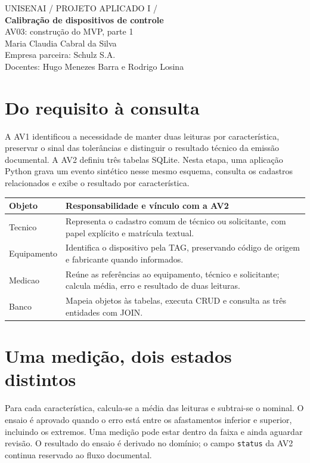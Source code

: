 \documentclass[12pt,a4paper]{article}
\begin{document}
\begin{center}
{\sffamily\small UNISENAI \quad / \quad PROJETO APLICADO I \quad / }\\[1.2cm]
{\sffamily\bfseries\LARGE Calibração de dispositivos de controle}\\[.35cm]
{\large AV03: construção do MVP, parte 1}\\[.8cm]
Maria Claudia Cabral da Silva\\
Empresa parceira: Schulz S.A.\\
Docentes: Hugo Menezes Barra e Rodrigo Losina
\end{center}
\section*{Do requisito à consulta}
A AV1 identificou a necessidade de manter duas leituras por característica, preservar o sinal das tolerâncias e distinguir o resultado técnico da emissão documental. A AV2 definiu três tabelas SQLite. Nesta etapa, uma aplicação Python grava um evento sintético nesse mesmo esquema, consulta os cadastros relacionados e exibe o resultado por característica.

\begin{tabularx}{\linewidth}{@{}lX@{}}
\toprule\textbf{Objeto} & \textbf{Responsabilidade e vínculo com a AV2}\\\midrule
Tecnico & Representa o cadastro comum de técnico ou solicitante, com papel explícito e matrícula textual.\\
Equipamento & Identifica o dispositivo pela TAG, preservando código de origem e fabricante quando informados.\\
Medicao & Reúne as referências ao equipamento, técnico e solicitante; calcula média, erro e resultado de duas leituras.\\
Banco & Mapeia objetos às tabelas, executa CRUD e consulta as três entidades com JOIN.\\\bottomrule
\end{tabularx}

\section*{Uma medição, dois estados distintos}
Para cada característica, calcula-se a média das leituras e subtrai-se o nominal. O ensaio é aprovado quando o erro está entre os afastamentos inferior e superior, incluindo os extremos. Uma medição pode estar dentro da faixa e ainda aguardar revisão. O resultado do ensaio é derivado no domínio; o campo \texttt{status} da AV2 continua reservado ao fluxo documental.
\end{document}
